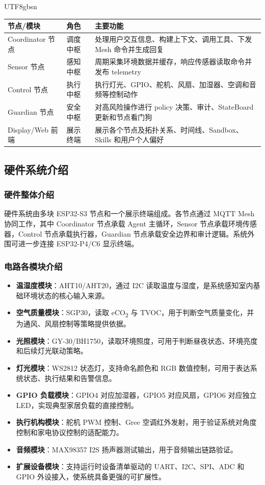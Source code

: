 \documentclass[a4paper,12pt]{article}
\begin{document}
\begin{CJK*}{UTF8}{gbsn}
\begin{table}[h]
\centering
\begin{tabular}{p{3.2cm}p{3.2cm}p{7.0cm}}
\toprule
\textbf{节点/模块} & \textbf{角色} & \textbf{主要功能} \\
\midrule
Coordinator 节点 & 调度中枢 & 处理用户交互信息、构建上下文、调用工具、下发 Mesh 命令并生成回复 \\
Sensor 节点 & 感知中枢 & 周期采集环境数据并缓存，响应传感器读取命令并发布 telemetry \\
Control 节点 & 执行中枢 & 执行灯光、GPIO、舵机、风扇、加湿器、空调和音频等控制动作 \\
Guardian 节点 & 安全中枢 & 对高风险操作进行 policy 决策、审计、StateBoard 更新和节点看门狗 \\
Display/Web 前端 & 展示终端 & 展示各个节点及拓扑关系、时间线、Sandbox、Skills 和用户个人偏好 \\
\bottomrule
\end{tabular}
\end{table}

\subsection{硬件系统介绍}

\subsubsection{硬件整体介绍}
硬件系统由多块 ESP32-S3 节点和一个展示终端组成。各节点通过 MQTT Mesh 协同工作，其中 Coordinator 节点承载 Agent 主循环，Sensor 节点承载环境传感器，Control 节点承载执行器，Guardian 节点承载安全边界和审计逻辑。系统外围可进一步连接 ESP32-P4/C6 显示终端。

\subsubsection{电路各模块介绍}
\begin{itemize}
  \item \textbf{温湿度模块}：AHT10/AHT20，通过 I2C 读取温度与湿度，是系统感知室内基础环境状态的核心输入来源。
  \item \textbf{空气质量模块}：SGP30，读取 eCO\textsubscript{2} 与 TVOC，用于判断空气质量变化，并为通风、风扇控制等策略提供依据。
  \item \textbf{光照模块}：GY-30/BH1750，读取环境照度，可用于判断昼夜状态、环境亮度和后续灯光联动策略。
  \item \textbf{灯光模块}：WS2812 状态灯，支持命名颜色和 RGB 数值控制，可用于表达系统状态、执行结果和告警信息。
  \item \textbf{GPIO 负载模块}：GPIO4 对应加湿器，GPIO5 对应风扇，GPIO6 对应独立 LED，实现典型家居负载的直接控制。
  \item \textbf{执行机构模块}：舵机 PWM 控制、Gree 空调红外发射，用于验证系统对角度控制和家电协议控制的适配能力。
  \item \textbf{音频模块}：MAX98357 I2S 扬声器测试输出，用于音频输出链路验证。
  \item \textbf{扩展设备模块}：支持运行时设备清单驱动的 UART、I2C、SPI、ADC 和 GPIO 外设接入，使系统具备更强的可扩展性。
\end{itemize}


\end{CJK*}
\end{document}
